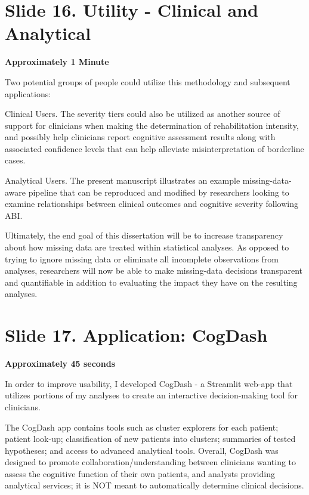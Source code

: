 \documentclass[
  11pt,
]{article}
\begin{document}
\section{Slide 16. Utility - Clinical and
Analytical}\label{slide-16.-utility---clinical-and-analytical}

\textbf{Approximately 1 Minute}

Two potential groups of people could utilize this methodology and
subsequent applications:

Clinical Users. The severity tiers could also be utilized as another
source of support for clinicians when making the determination of
rehabilitation intensity, and possibly help clinicians report cognitive
assessment results along with associated confidence levels that can help
alleviate misinterpretation of borderline cases.

Analytical Users. The present manuscript illustrates an example
missing-data-aware pipeline that can be reproduced and modified by
researchers looking to examine relationships between clinical outcomes
and cognitive severity following ABI.

Ultimately, the end goal of this dissertation will be to increase
transparency about how missing data are treated within statistical
analyses. As opposed to trying to ignore missing data or eliminate all
incomplete observations from analyses, researchers will now be able to
make missing-data decisions transparent and quantifiable in addition to
evaluating the impact they have on the resulting analyses.

\section{Slide 17. Application:
CogDash}\label{slide-17.-application-cogdash}

\textbf{Approximately 45 seconds}

In order to improve usability, I developed CogDash - a Streamlit web-app
that utilizes portions of my analyses to create an interactive
decision-making tool for clinicians.

The CogDash app contains tools such as cluster explorers for each
patient; patient look-up; classification of new patients into clusters;
summaries of tested hypotheses; and access to advanced analytical tools.
Overall, CogDash was designed to promote collaboration/understanding
between clinicians wanting to assess the cognitive function of their own
patients, and analysts providing analytical services; it is NOT meant to
automatically determine clinical decisions.
\end{document}
